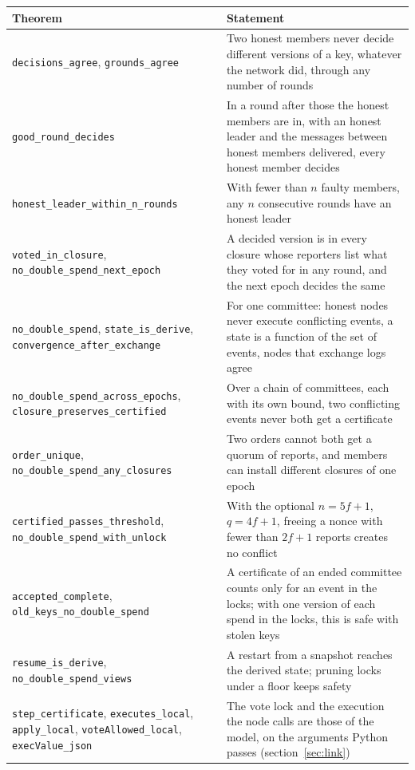 \documentclass[10pt,a4paper]{article}
\newcommand{\code}[1]{\texttt{#1}}
\begin{document}
\begin{center}\small
\begin{tabularx}{\textwidth}{@{}p{}L@{}}
\toprule
Theorem & Statement \\
\midrule
\code{decisions\_agree}, \code{grounds\_agree} & Two honest members never decide different versions of a key, whatever the network did, through any number of rounds \\
\code{good\_round\_decides} & In a round after those the honest members are in, with an honest leader and the messages between honest members delivered, every honest member decides \\
\code{honest\_leader\_within\_n\_rounds} & With fewer than $n$ faulty members, any $n$ consecutive rounds have an honest leader \\
\code{voted\_in\_closure}, \code{no\_double\_spend\_next\_epoch} & A decided version is in every closure whose reporters list what they voted for in any round, and the next epoch decides the same \\
\code{no\_double\_spend}, \code{state\_is\_derive}, \code{convergence\_after\_exchange} & For one committee: honest nodes never execute conflicting events, a state is a function of the set of events, nodes that exchange logs agree \\
\code{no\_double\_spend\_across\_epochs}, \code{closure\_preserves\_certified} & Over a chain of committees, each with its own bound, two conflicting events never both get a certificate \\
\code{order\_unique}, \code{no\_double\_spend\_any\_closures} & Two orders cannot both get a quorum of reports, and members can install different closures of one epoch \\
\code{certified\_passes\_threshold}, \code{no\_double\_spend\_with\_unlock} & With the optional $n = 5f+1$, $q = 4f+1$, freeing a nonce with fewer than $2f+1$ reports creates no conflict \\
\code{accepted\_complete}, \code{old\_keys\_no\_double\_spend} & A certificate of an ended committee counts only for an event in the locks; with one version of each spend in the locks, this is safe with stolen keys \\
\code{resume\_is\_derive}, \code{no\_double\_spend\_views} & A restart from a snapshot reaches the derived state; pruning locks under a floor keeps safety \\
\code{step\_certificate}, \code{executes\_local}, \code{apply\_local}, \code{voteAllowed\_local}, \code{execValue\_json} & The vote lock and the execution the node calls are those of the model, on the arguments Python passes (section~\ref{sec:link}) \\
\bottomrule
\end{tabularx}
\end{center}
\end{document}
